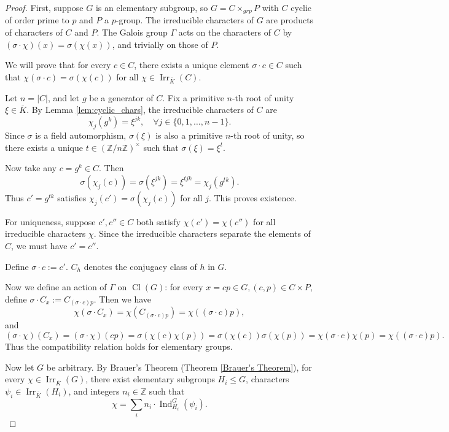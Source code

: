 \begin{proof}

First, suppose \(G\) is an elementary subgroup, so \(G = C \times_{grp} P\) with \(C\) cyclic of order prime to \(p\) and \(P\) a \(p\)-group. The irreducible characters of \(G\) are products of characters of \(C\) and \(P\). The Galois group \(\Gamma\) acts on the characters of \(C\) by \((\sigma\cdot\chi)(x) = \sigma(\chi(x))\), and trivially on those of \(P\). 

We will prove that for every $c\in C$, there exists a unique element \(\sigma\cdot c\in C\) such that \(\chi(\sigma\cdot c) = \sigma(\chi(c))\) for all \(\chi \in \operatorname{Irr}_{\overline K}(C)\). 

Let \(n = |C|\), and let \(g\) be a generator of \(C\). Fix a primitive \(n\)-th root of unity \(\xi \in \overline K\). By Lemma \ref{lem:cyclic_chars}, the irreducible characters of \(C\) are
\[
\chi_j(g^k) = \xi^{jk}, \quad \forall j \in\{0, 1, \dots, n-1\}.
\]
Since \(\sigma\) is a field automorphism, \(\sigma(\xi)\) is also a primitive \(n\)-th root of unity, so there exists a unique \(t \in (\mathbb Z/n\mathbb Z)^\times\) such that \(\sigma(\xi) = \xi^t\).

Now take any \(c = g^k \in C\). Then
\[
\sigma(\chi_j(c)) = \sigma(\xi^{jk}) = \xi^{t j k} = \chi_j(g^{t k}).
\]
Thus \(c' = g^{t k}\) satisfies \(\chi_j(c') = \sigma(\chi_j(c))\) for all \(j\). This proves existence.

For uniqueness, suppose \(c', c'' \in C\) both satisfy \(\chi(c') = \chi(c'')\) for all irreducible characters \(\chi\). Since the irreducible characters separate the elements of \(C\), we must have \(c' = c''\).

Define $\sigma\cdot c:=c'$.
\(C_h\) denotes the conjugacy class of \(h\) in $G$.

Now we define an action of $\Gamma$ on $\operatorname{Cl}(G)$: for every \(x = cp\in G,(c,p)\in C\times P\), define \(\sigma \cdot C_x := C_{(\sigma\cdot c)  p}\). Then we have \[\chi(\sigma\cdot C_x)=\chi(C_{(\sigma\cdot c) p})=\chi
((\sigma\cdot c)p),\] and\[(\sigma\cdot\chi)(
C_x)=(\sigma\cdot\chi)(cp)=\sigma(\chi(c)\chi(p))=\sigma(\chi(c))\sigma(\chi(p))=\chi(\sigma\cdot c)\chi(p)=\chi((\sigma\cdot c)p).\]
Thus the compatibility relation holds for elementary groups.


Now let \(G\) be arbitrary. By Brauer's Theorem (Theorem \ref{Brauer's Theorem}), for every \(\chi \in \operatorname{Irr}_{\overline K}(G)\), there exist elementary subgroups \(H_i \le G\), characters \(\psi_i \in \operatorname{Irr}_{\overline K}(H_i)\), and integers \(n_i \in \mathbb Z\) such that
\[
\chi = \sum_{i} n_i \cdot \operatorname{Ind}_{H_i}^G(\psi_i). \tag{$*$}
\]


\end{proof}

